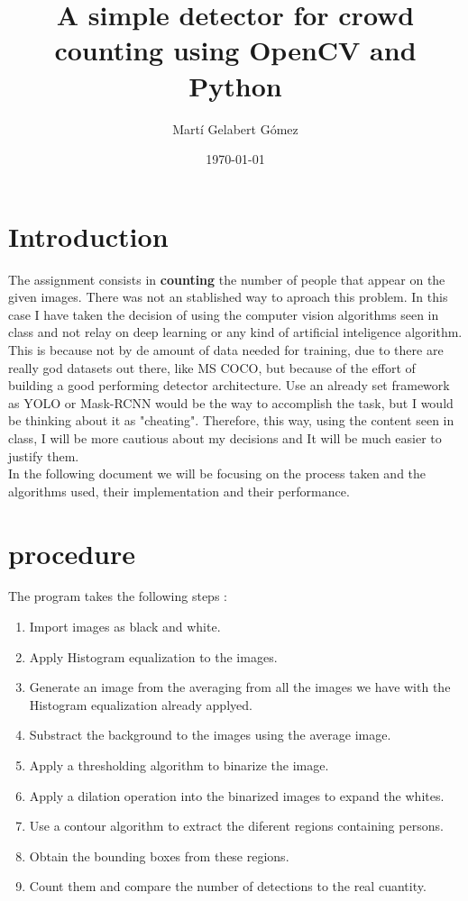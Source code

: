 \documentclass[11pt]{article}
\begin{document}
\title{A simple detector for crowd counting using OpenCV and Python}
\author{Martí Gelabert Gómez}
\date{\today}
\maketitle

\tableofcontents

\section{Introduction}
The assignment consists in \textbf{counting} the number of people that appear on the given images. There was not an stablished way to aproach this problem. In this case I have taken the decision of using the computer vision algorithms seen in class and not relay on deep learning or any kind of artificial inteligence algorithm. This is because not by de amount of data needed for training, due to there are really god datasets out there, like MS COCO, but because of the effort of building a good performing detector architecture. Use an already set framework as YOLO or Mask-RCNN would be the way to accomplish the task, but I would be thinking about it as "cheating". Therefore, this way, using the content seen in class, I will be more cautious about my decisions and It will be much easier to justify them.\\

In the following document  we will be focusing on the process taken and the algorithms used, their implementation and their performance.        

\section{procedure}
The program takes the following steps :

\begin{enumerate}
    \item Import images as black and white.
    \item Apply Histogram equalization to the images.
    \item Generate an image from the averaging from all the images we have with the Histogram equalization already applyed.
    \item Substract the background to the images using the average image.
    \item Apply a thresholding algorithm to binarize the image.
    \item Apply a dilation operation into the binarized images to expand the whites.
    \item Use a contour algorithm to extract the diferent regions containing persons.
    \item Obtain the bounding boxes from these regions.
    \item Count them and compare the number of detections to the real cuantity.
    \end{enumerate}
    
\end{document}
